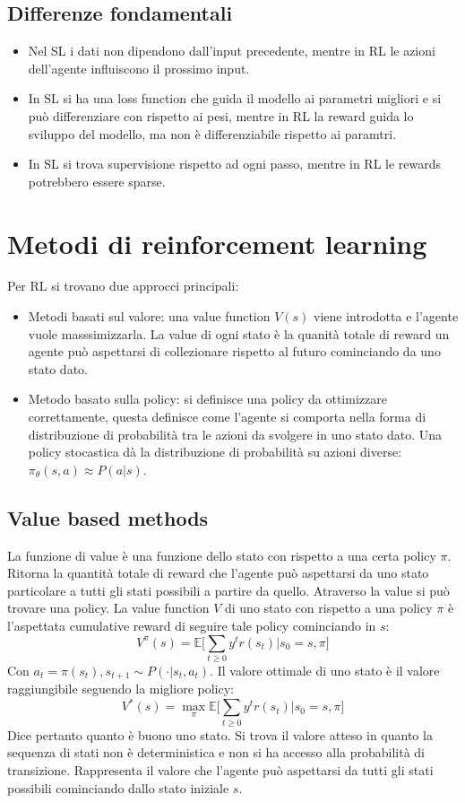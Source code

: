 	\subsection{Differenze fondamentali}
	\begin{itemize}
		\item Nel SL i dati non dipendono dall'input precedente, mentre in RL le azioni dell'agente influiscono il prossimo input.
		\item In SL si ha una loss function che guida il modello ai parametri migliori e si pu\`o differenziare con rispetto ai pesi, mentre in RL la reward guida lo sviluppo del modello, ma non \`e differenziabile rispetto ai paramtri.
		\item In SL si trova supervisione rispetto ad ogni passo, mentre in RL le rewards potrebbero essere sparse.
	\end{itemize}

\section{Metodi di reinforcement learning}
Per RL si trovano due approcci principali:
\begin{itemize}
	\item Metodi basati sul valore: una value function $V(s)$ viene introdotta e l'agente vuole masssimizzarla.
		La value di ogni stato \`e la quanit\`a totale di reward un agente pu\`o aspettarsi di collezionare rispetto al futuro cominciando da uno stato dato.
	\item Metodo basato sulla policy: si definisce una policy da ottimizzare correttamente, questa definisce come l'agente si comporta nella forma di distribuzione di probabilit\`a tra le azioni da svolgere in uno stato dato.
		Una policy stocastica d\`a la distribuzione di probabilit\`a su azioni diverse: $\pi_\theta(s,a)\approx P(a|s)$.

\end{itemize}

	\subsection{Value based methods}
	La funzione di value \`e una funzione dello stato con rispetto a una certa policy $\pi$.
	Ritorna la quantit\`a totale di reward che l'agente pu\`o aspettarsi da uno stato particolare a tutti gli stati possibili a partire da quello.
	Atraverso la value si pu\`o trovare una policy.
	La value function $V$ di uno stato con rispetto a una policy $\pi$ \`e l'aspettata cumulative reward di seguire tale policy cominciando in $s$:
	$$V^\pi(s) = \mathbb{E}\biggl[\sum\limits_{t\ge 0} y^tr(s_t)|s_0 = s,\pi\biggr]$$
	Con $a_t = \pi(s_t), s_{t+1}\sim P(\cdot|s_t, a_t)$.
	Il valore ottimale di uno stato \`e il valore raggiungibile seguendo la migliore policy:
	$$V^*(s) = \max_\pi\mathbb{E}\biggl[\sum\limits_{t\ge 0} y^tr(s_t)|s_0 = s,\pi\biggr]$$
	Dice pertanto quanto \`e buono uno stato.
	Si trova il valore atteso in quanto la sequenza di stati non \`e deterministica e non si ha accesso alla probabilit\`a di transizione.
	Rappresenta il valore che l'agente pu\`o aspettarsi da tutti gli stati possibili cominciando dallo stato iniziale $s$.

